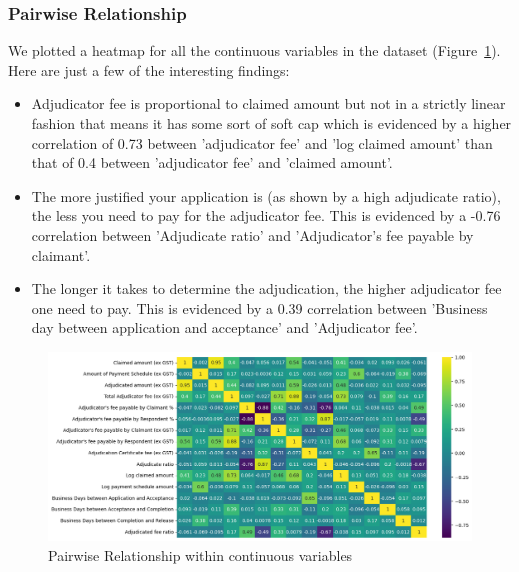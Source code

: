 \documentclass[12pt, b4paper]{article}
\begin{document}
      \subsubsection{Pairwise Relationship}
      We plotted a heatmap for all the continuous variables in the dataset (Figure~\ref{fig:corrAll}). Here are just a few of the interesting findings: 
      \begin{itemize}
        \item Adjudicator fee is proportional to claimed amount but not in a strictly linear fashion that means it has some sort of soft cap which is evidenced by a higher correlation of 0.73 between 'adjudicator fee' and 'log claimed amount' than that of 0.4 between 'adjudicator fee' and 'claimed amount'.
        \item The more justified your application is (as shown by a high adjudicate ratio), the less you need to pay for the adjudicator fee. This is evidenced by a -0.76 correlation between 'Adjudicate ratio' and 'Adjudicator's fee payable by claimant'.
        \item The longer it takes to determine the adjudication, the higher adjudicator fee one need to pay. This is evidenced by a 0.39 correlation between 'Business day between application and acceptance' and 'Adjudicator fee'.
      \end{itemize}

      \begin{figure}
        \begin{center}
          \includegraphics[width=\textwidth]{plots/corr_all.png}
        \end{center}
        \caption{Pairwise Relationship within continuous variables}
        \label{fig:corrAll}
      \end{figure}
     
\end{document}
